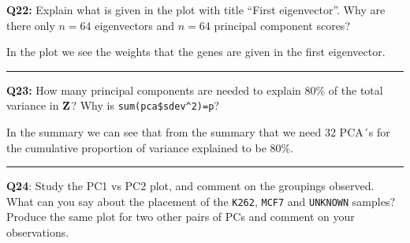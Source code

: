 \documentclass[]{article}
\begin{document}
\textbf{Q22:} Explain what is given in the plot with title ``First
eigenvector''. Why are there only \(n=64\) eigenvectors and \(n=64\)
principal component scores?

In the plot we see the weights that the genes are given in the first
eigenvector.

\begin{center}\rule{0.5\linewidth}{\linethickness}\end{center}

\textbf{Q23:} How many principal components are needed to explain 80\%
of the total variance in \({\bf Z}\)? Why is
\texttt{sum(pca\$sdev\^{}2)=p}?

In the summary we can see that from the summary that we need 32 PCA´s
for the cumulative proportion of variance explained to be 80\%.

\begin{center}\rule{0.5\linewidth}{\linethickness}\end{center}

\textbf{Q24}: Study the PC1 vs PC2 plot, and comment on the groupings
observed. What can you say about the placement of the \texttt{K262},
\texttt{MCF7} and \texttt{UNKNOWN} samples? Produce the same plot for
two other pairs of PCs and comment on your observations.
\end{document}
